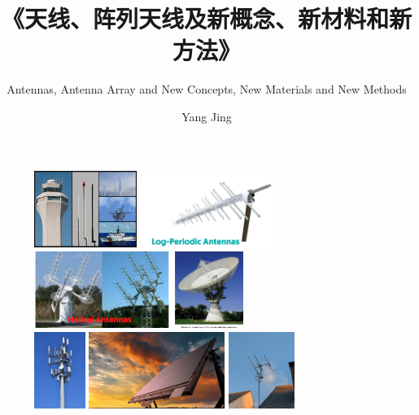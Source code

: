 \documentclass{ctexbeamer}
\title[天线、天线阵列及新概念、新材料和新方法]{《天线、阵列天线及新概念、新材料和新方法》}
\subtitle{Antennas, Antenna Array and New Concepts, New Materials and New Methods}
\author{Yang Jing\inst{1}}
\institute[Sch.EIE HFNU]
{
    \inst{1} %
    合肥师范学院\\
    电子信息与电气工程学院\\
}
\begin{document}
\frame{\titlepage}

\begin{frame}
    \begin{figure}
        \includegraphics[height=2.5cm]{Native-content-Muldipols-image-Rev-1.png}
        \includegraphics[height=2.5cm]{Log-Periodic-Antennas-768x432.png}\\
        \includegraphics[height=2.5cm]{Helical-Antennas-768x432.png}
        \includegraphics[height=2.5cm]{2-Figure1-1.png}\\
        \includegraphics[height=2.5cm]{Com_1.jpg}
        \includegraphics[height=2.5cm]{61648_O.jpg}
        \includegraphics[height=2.5cm]{tri-band-amsat-antenna-array.jpg}
    \end{figure}
\end{frame}
\end{document}
